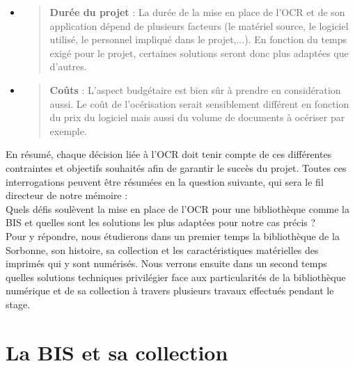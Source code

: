 \documentclass[a4paper,12pt,twoside]{book}
\begin{document}
\begin{itemize}
	\item
	\begin{quote}
		\textbf{Durée du projet} : La durée de la mise en place de l'OCR et de
		son application dépend de plusieurs facteurs (le matériel source, le
		logiciel utilisé, le personnel impliqué dans le projet,...). En
		fonction du temps exigé pour le projet, certaines solutions seront
		donc plus adaptées que d'autres.
	\end{quote}
	\item
	\begin{quote}
		\textbf{Coûts} : L'aspect budgétaire est bien sûr à
		prendre en considération aussi. Le coût de l'océrisation serait
		sensiblement différent en fonction du prix du logiciel mais aussi du
		volume de documents à océriser par exemple. \\
	\end{quote}
\end{itemize} 

En résumé, chaque décision liée à l'OCR doit tenir
compte de ces différentes contraintes et objectifs souhaités afin de
garantir le succès du projet. Toutes ces interrogations peuvent être
résumées en la question suivante, qui sera le fil directeur de notre
mémoire : \\

Quels défis soulèvent la mise en place de l'OCR pour une bibliothèque
comme la BIS et quelles sont les solutions les plus adaptées pour notre
cas précis ? \\

Pour y répondre, nous étudierons dans un premier temps la bibliothèque
de la Sorbonne, son histoire, sa collection et les caractéristiques
matérielles des imprimés qui y sont numérisés. Nous verrons ensuite dans
un second temps quelles solutions techniques privilégier face aux
particularités de la bibliothèque numérique et de sa collection à
travers plusieurs travaux effectués pendant le stage.

\newpage{\pagestyle{empty}\cleardoublepage}

	\mainmatter

	

	\chapter{La BIS et sa collection}
\end{document}
